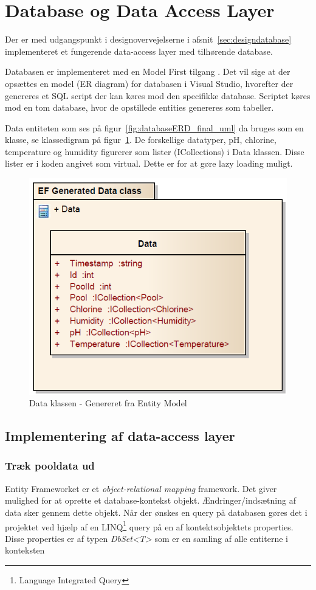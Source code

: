 \section{Database og Data Access Layer}

Der er med udgangspunkt i designovervejelserne i afsnit~\ref{sec:designdatabase} implementeret et fungerende data-access layer med tilhørende database.

Databasen er implementeret med en Model First tilgang \cite{microsoftdatadevelopercenter2016}. Det vil sige at der opsættes en model (ER diagram) for databasen i Visual Studio, hvorefter der genereres et SQL script der kan køres mod den specifikke database. Scriptet køres mod en tom database, hvor de opstillede entities genereres som tabeller.

Data entiteten som ses på figur~\ref{fig:databaseERD_final_uml} da bruges som en klasse, se klassedigram på figur~\ref{fig:efGeneratedData}. De forskellige datatyper, pH, chlorine, temperature og humidity figurerer som lister (ICollections) i Data klassen. Disse lister er i koden angivet som virtual. Dette er for at gøre lazy loading muligt.

\begin{figure}
\centering
\includegraphics[width=0.5\linewidth]{figs/implementering/efGeneratedData.PNG}
\caption{Data klassen - Genereret fra Entity Model}
\label{fig:efGeneratedData}
\end{figure}

\subsection{Implementering af data-access layer}

\subsubsection{Træk pooldata ud}

Entity Frameworket er et \textit{object-relational mapping} framework. Det giver mulighed for at oprette et database-kontekst objekt. Ændringer/indsætning af data sker gennem dette objekt. Når der ønskes en query på databasen gøres det i projektet ved hjælp af en LINQ\footnote{Language Integrated Query} query på en af kontektsobjektets properties. Disse properties er af typen \textit{DbSet<T>} som er en samling af alle entiterne i konteksten

